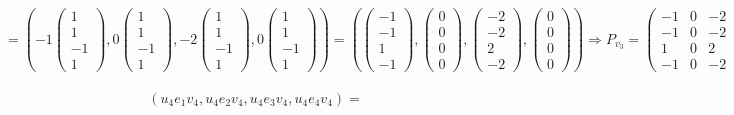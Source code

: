 \documentclass{article}
\begin{document}
$$= \left(-1\begin{pmatrix}1 \\ 1 \\ -1 \\ 1\end{pmatrix}, 0\begin{pmatrix}1 \\ 1 \\ -1 \\ 1\end{pmatrix}, -2\begin{pmatrix}1 \\ 1 \\ -1 \\ 1\end{pmatrix}, 0\begin{pmatrix}1 \\ 1 \\ -1 \\ 1\end{pmatrix}\right) = \left(\begin{pmatrix}-1 \\-1 \\ 1 \\ -1\end{pmatrix}, \begin{pmatrix}0 \\ 0 \\ 0 \\ 0\end{pmatrix}, \begin{pmatrix}-2 \\ -2 \\ 2 \\ -2\end{pmatrix}, \begin{pmatrix}0 \\ 0 \\ 0 \\ 0\end{pmatrix}\right) \Rightarrow P_{v_3} = \begin{pmatrix}
-1 & 0 & -2 & 0 \\
-1 & 0 & -2 & 0 \\
1 & 0 & 2 & 0 \\
-1 & 0 & -2 & 0
\end{pmatrix} $$ \\
$$\left(u_4e_1v_4, u_4e_2v_4, u_4e_3v_4, u_4e_4v_4\right) =$$
\end{document}
